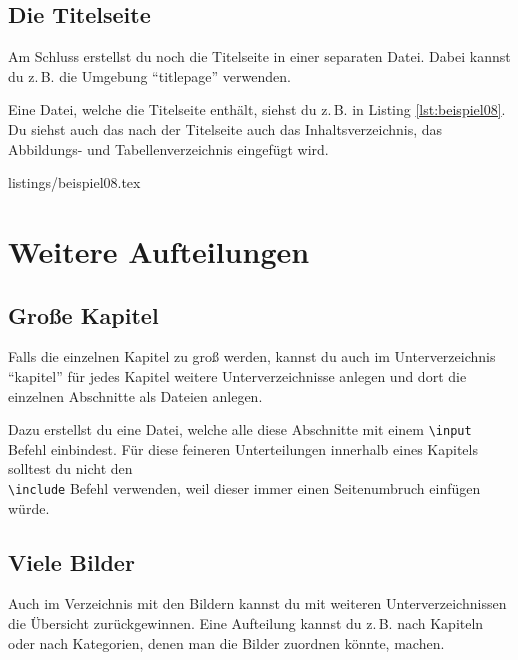 \subsection{Die Titelseite}

Am Schluss erstellst du noch die Titelseite in einer separaten Datei. Dabei kannst du z.\,B. die Umgebung \enquote{titlepage} verwenden.

Eine Datei, welche die Titelseite enthält, siehst du z.\,B. in Listing \ref{lst:beispiel08}. Du siehst auch das nach der Titelseite auch das Inhaltsverzeichnis, das Abbildungs- und Tabellenverzeichnis eingefügt wird.

%
	{listings/beispiel08.tex}

\section{Weitere Aufteilungen}

\subsection{Große Kapitel}

Falls die einzelnen Kapitel zu groß werden, kannst du auch im Unterverzeichnis \enquote{kapitel} für jedes Kapitel weitere Unterverzeichnisse anlegen und dort die einzelnen Abschnitte als Dateien anlegen.

Dazu erstellst du eine Datei, welche alle diese Abschnitte mit einem \texttt{\textbackslash input} Befehl einbindest. Für diese feineren Unterteilungen innerhalb eines Kapitels solltest du nicht den\\ \texttt{\textbackslash include} Befehl verwenden, weil dieser immer einen Seitenumbruch einfügen würde.

\subsection{Viele Bilder}

Auch im Verzeichnis mit den Bildern kannst du mit weiteren Unterverzeichnissen die Übersicht zurückgewinnen. Eine Aufteilung kannst du z.\,B. nach Kapiteln oder nach Kategorien, denen man die Bilder zuordnen könnte, machen.

%
%
